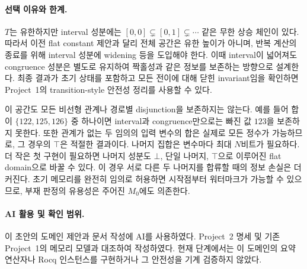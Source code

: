 \documentclass[a4paper,10pt]{article}
\begin{document}
\paragraph{선택 이유와 한계.}
$T$는 유한하지만 interval 성분에는
$[0,0]\subsetneq[0,1]\subsetneq\cdots$ 같은 무한 상승 체인이 있다.
따라서 이전 flat constant 제안과 달리 전체 공간은 유한 높이가 아니며,
반복 계산의 종료를 위해 interval 성분에 widening 등을 도입해야 한다.
이때 interval이 넓어져도 congruence 성분은 별도로 유지하여
짝홀성과 같은 정보를 보존하는 방향으로 설계한다.
최종 결과가 초기 상태를 포함하고 모든 전이에 대해 닫힌 invariant임을 확인하면
Project~1의 transition-style 안전성 정리를 사용할 수 있다.

이 공간도 모든 비선형 관계나 경로별 disjunction을 보존하지는 않는다.
예를 들어 합이 $\{122,125,126\}$ 중 하나이면
interval과 congruence만으로는 빠진 값 $123$을 보존하지 못한다.
또한 관계가 없는 두 임의의 입력 변수의 합은 실제로 모든 정수가 가능하므로,
그 경우의 $\top$은 적절한 결과이다.
나머지 집합은 변수마다 최대 $N$비트가 필요하다.
더 작은 첫 구현이 필요하면 나머지 성분도
$\bot$, 단일 나머지, $\top$으로 이루어진 flat domain으로 바꿀 수 있다.
이 경우 서로 다른 두 나머지를 합류할 때의 정보 손실은 더 커진다.
초기 메모리를 완전히 임의로 허용하면 시작점부터 워터마크가 가능할 수 있으므로,
부재 판정의 유용성은 주어진 $M_0$에도 의존한다.

\paragraph{AI 활용 및 확인 범위.}
이 초안의 도메인 제안과 문서 작성에 AI를 사용하였다.
Project~2 명세 및 기존 Project~1의 메모리 모델과 대조하여 작성하였다.
현재 단계에서는 이 도메인의 요약 연산자나 Rocq 인스턴스를 구현하거나
그 안전성을 기계 검증하지 않았다.
\end{document}
